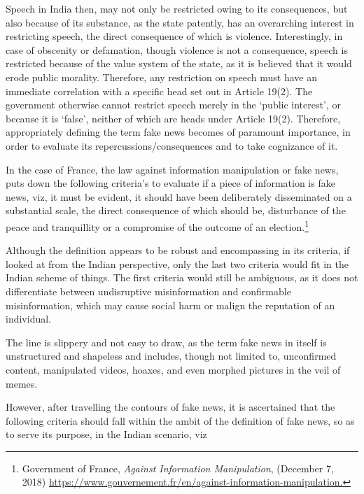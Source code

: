 \begin{multicols}{2}
\noi
Speech in India then, may not only be restricted owing to its consequences, but also because
of its substance, as the state patently, has an overarching interest in restricting speech, the
direct consequence of which is violence. Interestingly, in case of obscenity or defamation,
though violence is not a consequence, speech is restricted because of the value system of the
state, as it is believed that it would erode public morality. Therefore, any restriction on speech
must have an immediate correlation with a specific head set out in Article 19(2). The
government otherwise cannot restrict speech merely in the ‘public interest’, or because it is
‘false’, neither of which are heads under Article 19(2). Therefore, appropriately defining the
term fake news becomes of paramount importance, in order to evaluate its
repercussions/consequences and to take cognizance of it.

\noi
In the case of France, the law against information manipulation or fake news, puts down the
following criteria’s to evaluate if a piece of information is fake news, viz, it must be evident,
it should have been deliberately disseminated on a substantial scale, the direct consequence of
which should be, disturbance of the peace and tranquillity or a compromise of the outcome of
an election.\footnote{Government of France, \textit{Against Information Manipulation}, (December 7, 2018)
\url{https://www.gouvernement.fr/en/against-information-manipulation.}}

\noi
Although the definition appears to be robust and encompassing in its criteria, if looked at
from the Indian perspective, only the last two criteria would fit in the Indian scheme of
things. The first criteria would still be ambiguous, as it does not differentiate between
undisruptive misinformation and confirmable misinformation, which may cause social harm
or malign the reputation of an individual.

\noi
The line is slippery and not easy to draw, as the term fake news in itself is unstructured and
shapeless and includes, though not limited to, unconfirmed content, manipulated videos,
hoaxes, and even morphed pictures in the veil of memes.

\noi
However, after travelling the contours of fake news, it is ascertained that the following criteria
should fall within the ambit of the definition of fake news, so as to serve its purpose, in the
Indian scenario, viz

\vspace{-.3cm}


\end{multicols}

